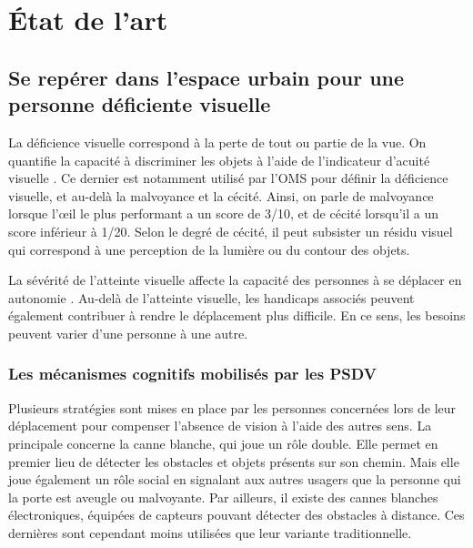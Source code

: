 \chapter{État de l'art}

\section{Se repérer dans l'espace urbain pour une personne déficiente visuelle}

%
%

La déficience visuelle correspond à la perte de tout ou partie de la vue. On quantifie la capacité à discriminer les objets à l'aide de l'indicateur d'acuité visuelle . Ce dernier est notamment utilisé par l'OMS pour définir la déficience visuelle, et au-delà la malvoyance et la cécité. Ainsi, on parle de malvoyance lorsque l'œil le plus performant a un score de 3/10, et de cécité lorsqu'il a un score inférieur à 1/20. Selon le degré de cécité, il peut subsister un résidu visuel qui correspond à une perception de la lumière ou du contour des objets. 

La sévérité de l'atteinte visuelle affecte la capacité des personnes à se déplacer en autonomie \cite{homere_2023}. Au-delà de l'atteinte visuelle, les handicaps associés peuvent également contribuer à rendre le déplacement plus difficile. En ce sens, les besoins peuvent varier d'une personne à une autre.

\subsection{Les mécanismes cognitifs mobilisés par les PSDV}

%
%

Plusieurs stratégies sont mises en place par les personnes concernées lors de leur déplacement pour compenser l'absence de vision à l'aide des autres sens. La principale concerne la canne blanche, qui joue un rôle double. Elle permet en premier lieu de détecter les obstacles et objets présents sur son chemin. Mais elle joue également un rôle social en signalant aux autres usagers que la personne qui la porte est aveugle ou malvoyante. Par ailleurs, il existe des cannes blanches électroniques, équipées de capteurs pouvant détecter des obstacles à distance. Ces dernières sont cependant moins utilisées que leur variante traditionnelle. 

